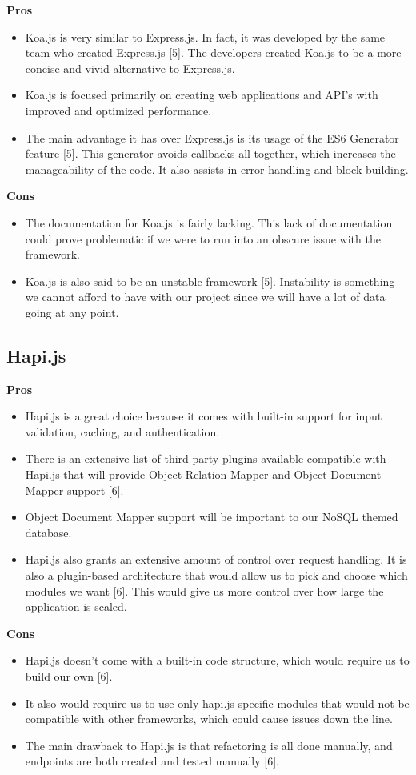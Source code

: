 \documentclass[onecolumn, draftclsnofoot,10pt, compsoc]{IEEEtran}
\begin{document}
		\textbf{Pros}
			\begin{itemize}
				\item Koa.js is very similar to Express.js. In fact, it was developed by the same team who created Express.js [5]. The developers created Koa.js to be a more concise and vivid alternative to Express.js. 
				\item Koa.js is focused primarily on creating web applications and API's with improved and optimized performance. 
				\item The main advantage it has over Express.js is its usage of the ES6 Generator feature [5]. This generator avoids callbacks all together, which increases the manageability of the code. It also assists in error handling and block building.
			\end{itemize}	
		\textbf{Cons}
			\begin{itemize}
				\item The documentation for Koa.js is fairly lacking. This lack of documentation could prove problematic if we were to run into an obscure issue with the framework. 
				\item Koa.js is also said to be an unstable framework [5]. Instability is something we cannot afford to have with our project since we will have a lot of data going at any point.
			\end{itemize}	
	\subsection{Hapi.js}
	
		\textbf{Pros} 
			\begin{itemize}
				\item Hapi.js is a great choice because it comes with built-in support for input validation, caching, and authentication. 
				\item There is an extensive list of third-party plugins available compatible with Hapi.js that will provide Object Relation Mapper and Object Document Mapper support [6]. 
				\item Object Document Mapper support will be important to our NoSQL themed database. 
				\item Hapi.js also grants an extensive amount of control over request handling. It is also a plugin-based architecture that would allow us to pick and choose which modules we want [6]. This would give us more control over how large the application is scaled.
			\end{itemize}	
		\textbf{Cons}
			\begin{itemize}
				\item Hapi.js doesn't come with a built-in code structure, which would require us to build our own [6].
				\item It also would require us to use only hapi.js-specific modules that would not be compatible with other frameworks, which could cause issues down the line. 
				\item The main drawback to Hapi.js is that refactoring is all done manually, and endpoints are both created and tested manually [6].
			\end{itemize}	
	
\end{document}
